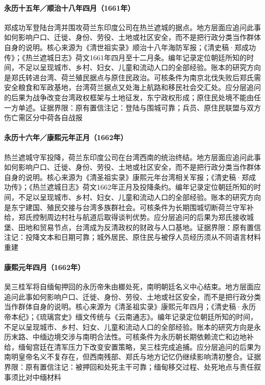 \hypertarget{social:EQ-1661-ZHENG-TAIWAN-LANDING}{}\paragraph{永历十五年／顺治十八年四月（1661年）}郑成功军登陆台湾并围攻荷兰东印度公司在热兰遮城的据点。地方层面应追问此事如何影响户口、迁徙、身份、劳役、土地或社区安全，而不是把行政分类当作群体自身的说明。核心来源为《清世祖实录》顺治十八年海防军报；《清史稿·郑成功传》；《热兰遮城日志》荷文1661年四月至十二月条。编年记录定位朝廷所知的时间，不足以呈现城市、乡村、妇女、儿童和流动人口的全部经验。账本的研究方向是郑氏转进台湾、荷兰殖民据点与原住民政治。可核条件为南京北伐失败后郑氏需安全粮食和军政基地，台湾荷兰据点又处海上航路和移民社会交汇处。应分层追问的后果为战争改变台湾政权框架与土地征发，东宁政权形成；原住民处境不能由任一方单述。证据界限：原有置信注记：登陆与围城可靠；兵员、原住民联盟与双方伤亡需区分中荷各自战报
\hypertarget{social:EQ-1662-ZEELANDIA}{}\paragraph{永历十六年／康熙元年正月（1662年）}热兰遮城守军投降，荷兰东印度公司在台湾西南的统治终结。地方层面应追问此事如何影响户口、迁徙、身份、劳役、土地或社区安全，而不是把行政分类当作群体自身的说明。核心来源为《清圣祖实录》康熙元年台湾相关军报；《清史稿·郑成功传》；《热兰遮城日志》荷文1662年正月及投降条约。编年记录定位朝廷所知的时间，不足以呈现城市、乡村、妇女、儿童和流动人口的全部经验。账本的研究方向是东宁建国、殖民交接与台湾多族群社会。可核条件为长期围城切断荷兰守军补给，郑氏控制周边村社与航道后取得谈判优势。应分层追问的后果为郑氏接收城堡、田地和贸易节点，台湾成为反清政权的财政与人口基地。证据界限：原有置信注记：投降文本和日期可靠；城外居民、原住民与被俘人员经历须从不同语言材料重建
\hypertarget{social:EQ-1662-YONGLI-EXECUTION}{}\paragraph{康熙元年四月（1662年）}吴三桂军将自缅甸押回的永历帝朱由榔处死，南明朝廷名义中心结束。地方层面应追问此事如何影响户口、迁徙、身份、劳役、土地或社区安全，而不是把行政分类当作群体自身的说明。核心来源为《清圣祖实录》康熙元年四月；《清史稿·永历帝本纪》；《琉璃宫史》缅文传统与《云南通志》。编年记录定位朝廷所知的时间，不足以呈现城市、乡村、妇女、儿童和流动人口的全部经验。账本的研究方向是永历末路、中缅边境交涉与南明合法性。可核条件为永历朝长期依赖流亡和边地补给，缅甸宫廷在清军压力下改变安置策略，吴三桂完成追捕。应分层追问的后果为南明皇帝名义不复存在，但西南残部、郑氏与地方记忆仍继续影响清初整合。证据界限：原有置信注记：被押回和处死主干可靠；缅甸移交过程、处死地点与责任叙事须比对中缅材料
